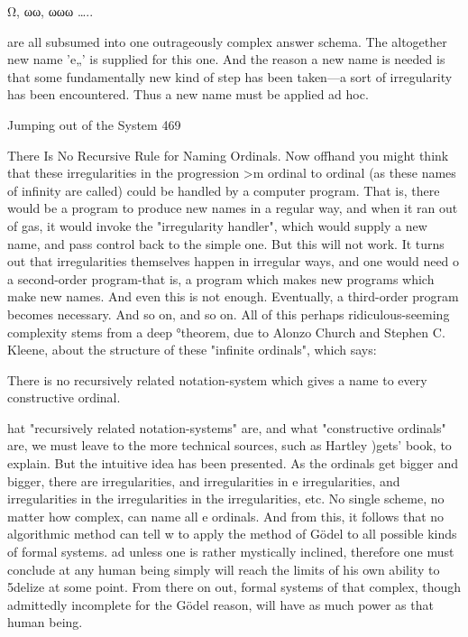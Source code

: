 {       Ω, ωω, ωωω …..

are all subsumed into one outrageously complex answer schema. The altogether new
name 'e„' is supplied for this one. And the reason a new name is needed is that some
fundamentally new kind of step has been taken—a sort of irregularity has been
encountered. Thus a new name must be applied ad hoc.




Jumping out of the System                                                                  469

               There Is No Recursive Rule for Naming Ordinals.
Now offhand you might think that these irregularities in the progression >m ordinal to
ordinal (as these names of infinity are called) could be handled by a computer program.
That is, there would be a program to produce new names in a regular way, and when it
ran out of gas, it would invoke the "irregularity handler", which would supply a new
name, and pass control back to the simple one. But this will not work. It turns out that
irregularities themselves happen in irregular ways, and one would need o a second-order
program-that is, a program which makes new programs which make new names. And
even this is not enough. Eventually, a third-order program becomes necessary. And so on,
and so on.
        All of this perhaps ridiculous-seeming complexity stems from a deep °theorem,
due to Alonzo Church and Stephen C. Kleene, about the structure of these "infinite
ordinals", which says:

            There is no recursively related notation-system which gives a
            name to every constructive ordinal.

hat "recursively related notation-systems" are, and what "constructive ordinals" are, we
must leave to the more technical sources, such as Hartley )gets' book, to explain. But the
intuitive idea has been presented. As the ordinals get bigger and bigger, there are
irregularities, and irregularities in e irregularities, and irregularities in the irregularities in
the irregularities, etc. No single scheme, no matter how complex, can name all e ordinals.
And from this, it follows that no algorithmic method can tell w to apply the method of
Gödel to all possible kinds of formal systems. ad unless one is rather mystically inclined,
therefore one must conclude at any human being simply will reach the limits of his own
ability to 5delize at some point. From there on out, formal systems of that complex,
though admittedly incomplete for the Gödel reason, will have as much power as that
human being.

}
